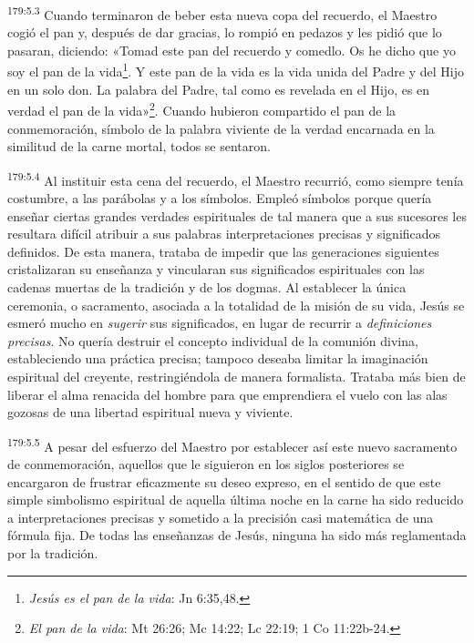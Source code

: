 \par
\textsuperscript{179:5.3} Cuando terminaron de beber esta nueva copa del recuerdo, el Maestro cogió el pan y, después de dar gracias, lo rompió en pedazos y les pidió que lo pasaran, diciendo: «Tomad este pan del recuerdo y comedlo. Os he dicho que yo soy el pan de la vida\footnote{\textit{Jesús es el pan de la vida}: Jn 6:35,48.}. Y este pan de la vida es la vida unida del Padre y del Hijo en un solo don. La palabra del Padre, tal como es revelada en el Hijo, es en verdad el pan de la vida»\footnote{\textit{El pan de la vida}: Mt 26:26; Mc 14:22; Lc 22:19; 1 Co 11:22b-24.}. Cuando hubieron compartido el pan de la conmemoración, símbolo de la palabra viviente de la verdad encarnada en la similitud de la carne mortal, todos se sentaron.

\par
\textsuperscript{179:5.4} Al instituir esta cena del recuerdo, el Maestro recurrió, como siempre tenía costumbre, a las parábolas y a los símbolos. Empleó símbolos porque quería enseñar ciertas grandes verdades espirituales de tal manera que a sus sucesores les resultara difícil atribuir a sus palabras interpretaciones precisas y significados definidos. De esta manera, trataba de impedir que las generaciones siguientes cristalizaran su enseñanza y vincularan sus significados espirituales con las cadenas muertas de la tradición y de los dogmas. Al establecer la única ceremonia, o sacramento, asociada a la totalidad de la misión de su vida, Jesús se esmeró mucho en \textit{sugerir} sus significados, en lugar de recurrir a \textit{definiciones precisas}. No quería destruir el concepto individual de la comunión divina, estableciendo una práctica precisa; tampoco deseaba limitar la imaginación espiritual del creyente, restringiéndola de manera formalista. Trataba más bien de liberar el alma renacida del hombre para que emprendiera el vuelo con las alas gozosas de una libertad espiritual nueva y viviente.

\par
\textsuperscript{179:5.5} A pesar del esfuerzo del Maestro por establecer así este nuevo sacramento de conmemoración, aquellos que le siguieron en los siglos posteriores se encargaron de frustrar eficazmente su deseo expreso, en el sentido de que este simple simbolismo espiritual de aquella última noche en la carne ha sido reducido a interpretaciones precisas y sometido a la precisión casi matemática de una fórmula fija. De todas las enseñanzas de Jesús, ninguna ha sido más reglamentada por la tradición.

